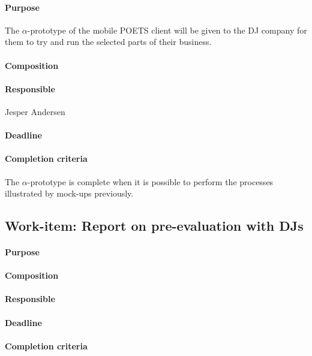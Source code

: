 \documentclass[envcountsame]{llncs}
\begin{document}
\paragraph{Purpose} The $\alpha$-prototype of the mobile POETS client
will be given to the DJ company for them to try and run the selected
parts of their business. 

\paragraph{Composition}

\paragraph{Responsible} Jesper Andersen

\paragraph{Deadline}

\paragraph{Completion criteria} The $\alpha$-prototype is complete
when it is possible to perform the processes illustrated by mock-ups
previously.

\subsection*{Work-item: Report on pre-evaluation with DJs}
\paragraph{Purpose}

\paragraph{Composition}

\paragraph{Responsible}

\paragraph{Deadline}

\paragraph{Completion criteria}
\end{document}
